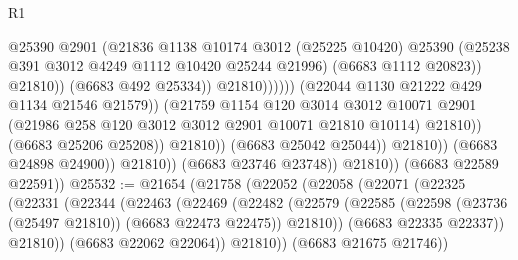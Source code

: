 \begin{lexlean}{R1}
\begin{coremodule}
                                                    @25390
                                                    @2901
                                                    (@21836
                                                      @1138
                                                      @10174
                                                      @3012
                                                      (@25225 @10420)
                                                      @25390
                                                      (@25238
                                                        @391
                                                        @3012
                                                        @4249
                                                        @1112
                                                        @10420
                                                        @25244
                                                        @21996)
                                                      (@6683 @1112 @20823))
                                                    @21810))
                                                (@6683 @492 @25334))
                                              @21810))))))
                                  (@22044 @1130 @21222 @429 @1134 @21546 @21579))
                                (@21759
                                  @1154
                                  @120
                                  @3014
                                  @3012
                                  @10071
                                  @2901
                                  (@21986 @258 @120 @3012 @3012 @2901 @10071 @21810 @10114)
                                  @21810))
                              (@6683 @25206 @25208))
                            @21810))
                        (@6683 @25042 @25044))
                      @21810))
                  (@6683 @24898 @24900))
                @21810))
            (@6683 @23746 @23748))
          @21810))
      (@6683 @22589 @22591))
@25532 := @21654
    (@21758
      (@22052
        (@22058
          (@22071
            (@22325
              (@22331
                (@22344
                  (@22463
                    (@22469
                      (@22482
                        (@22579
                          (@22585 (@22598 (@23736 (@25497 @21810)) (@6683 @22473 @22475)) @21810))
                        (@6683 @22335 @22337))
                      @21810))
                  (@6683 @22062 @22064))
                @21810))
            (@6683 @21675 @21746))

\end{coremodule}
\end{lexlean}
